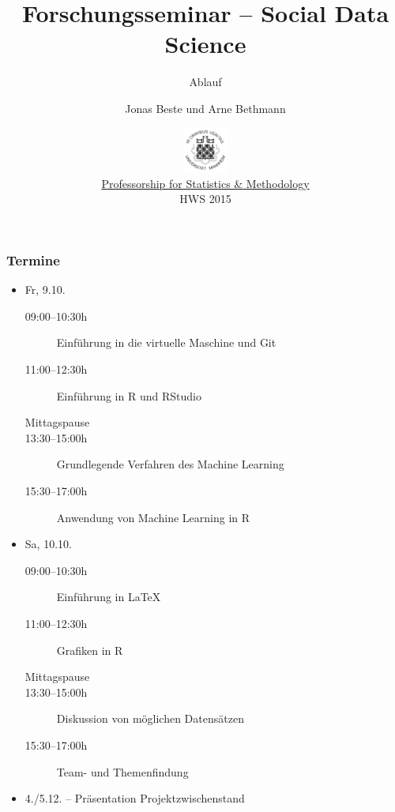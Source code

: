 \documentclass{beamer}
\title{Forschungsseminar -- Social Data Science}
\subtitle{Ablauf}
\author[Beste \& Bethmann]{Jonas Beste und Arne Bethmann}
\date{\includegraphics[height=1.5cm]{../../img/150px-Uni_Mannheim_Siegel.png} \\
  \href{http://sswml.uni-mannheim.de/}{Professorship for Statistics \& Methodology} \\
  HWS 2015}
\begin{document}
\begin{frame}
  \titlepage
\end{frame}


\begin{frame}
  \frametitle{Termine}
  \begin{itemize}
  \item Fr, 9.10.
    \begin{description}
    \item[09:00--10:30h] Einführung in die virtuelle Maschine und Git
    \item[11:00--12:30h] Einführung in R und RStudio
    \item[Mittagspause]
    \item[13:30--15:00h] Grundlegende Verfahren des Machine Learning
    \item[15:30--17:00h] Anwendung von Machine Learning in R
    \end{description}
  \item Sa, 10.10.
    \begin{description}
    \item[09:00--10:30h] Einführung in \LaTeX
    \item[11:00--12:30h] Grafiken in R
    \item[Mittagspause]
    \item[13:30--15:00h] Diskussion von möglichen Datensätzen
    \item[15:30--17:00h] Team- und Themenfindung
    \end{description}
  \item 4./5.12. -- Präsentation Projektzwischenstand
  \end{itemize}
\end{frame}
\end{document}
